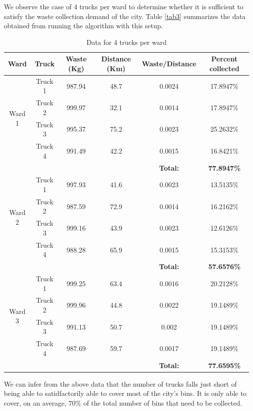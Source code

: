\documentclass[12pt]{article}
\begin{document}
We observe the case of 4 trucks per ward to determine whether it is sufficient to satisfy the waste collection demand of the city. Table \ref{tab3} summarizes the data obtained from running the algorithm with this setup.
\begin{table}[H]
    \centering
    \caption{ Data for 4 trucks per ward} \label{tab2}
    \vspace*{0.3cm}
    \begin{tabular}{|c|c|c|c|c|c|}
        \hline Ward & Truck & Waste (Kg) & Distance (Km) & Waste/Distance & Percent collected \\
        \hline \multirow{4}{*}{Ward 1} & Truck 1 & 987.94& 48.7 &0.0024  &17.8947\% \\
        \cline{2-6}& Truck 2 &999.97&32.1&0.0014&17.8947\%\\        
        \cline{2-6}& Truck 3 &995.37&75.2&0.0023&25.2632\%\\        
        \cline{2-6}& Truck 4 &991.49&42.2&0.0015&16.8421\%\\
        \hline & & & &\textbf{Total:} &\textbf{77.8947\%}\\
        \hline \multirow{4}{*}{Ward 2} & Truck 1 &997.93 &41.6  & 0.0023  &13.5135\% \\
        \cline{2-6}& Truck 2 &987.59&72.9&0.0014&16.2162\%\\        
        \cline{2-6}& Truck 3 &999.16&43.9&0.0023&12.6126\%\\        
        \cline{2-6}& Truck 4 &988.28&65.9&0.0015&15.3153\%\\
        \hline & & & &\textbf{Total:} &\textbf{57.6576\%}\\     
        \hline \multirow{4}{*}{Ward 3} & Truck 1 &999.25  &63.4  &0.0016  &20.2128\% \\
        \cline{2-6}& Truck 2 &999.96&44.8&0.0022&19.1489\%\\        
        \cline{2-6}& Truck 3 &991.13&50.7&0.002&19.1489\%\\        
        \cline{2-6}& Truck 4 &987.69&59.7&0.0017&19.1489\%\\
        \hline & & & &\textbf{Total:} &\textbf{77.6595\%}\\
        \hline      
    \end{tabular}
\end{table}

We can infer from the above data that the number of trucks falls just short of being able to satidfactorily able to cover most of the city's bins. It is only able to cover, on an average, 70\% of the total number of bins that need to be collected.
\end{document}
